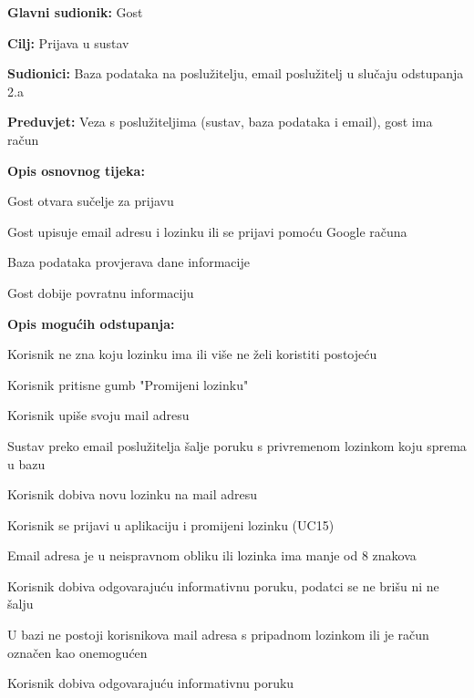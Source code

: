 				
				\noindent {}
				\begin{packed_item}
					\item \textbf{Glavni sudionik:} Gost
					\item  \textbf{Cilj:} Prijava u sustav
					\item  \textbf{Sudionici:} Baza podataka na poslužitelju, email poslužitelj u slučaju odstupanja 2.a
					\item  \textbf{Preduvjet:} Veza s poslužiteljima (sustav, baza podataka i email), gost ima račun
					\item  \textbf{Opis osnovnog tijeka:}
					\item[] \begin{packed_enum}
						\item Gost otvara sučelje za prijavu
						\item Gost upisuje email adresu i lozinku ili se prijavi pomoću Google računa
						\item Baza podataka provjerava dane informacije
						\item Gost dobije povratnu informaciju
					\end{packed_enum}
					\item  \textbf{Opis mogućih odstupanja:}
					\item[] \begin{packed_item}
						\item[2.a] Korisnik ne zna koju lozinku ima ili više ne želi koristiti postojeću
						\item[] \begin{packed_enum}
							\item Korisnik pritisne gumb "Promijeni lozinku"
							\item Korisnik upiše svoju mail adresu
							\item Sustav preko email poslužitelja šalje poruku s privremenom lozinkom koju sprema u bazu
							\item Korisnik dobiva novu lozinku na mail adresu
							\item Korisnik se prijavi u aplikaciju i promijeni lozinku (UC15)
						\end{packed_enum}
					    \item[3.a] Email adresa je u neispravnom obliku ili lozinka ima manje od 8 znakova
						\item[] \begin{packed_enum}
							\item Korisnik dobiva odgovarajuću informativnu poruku, podatci se ne brišu ni ne šalju
						\end{packed_enum}
						\item[3.b] U bazi ne postoji korisnikova mail adresa s pripadnom lozinkom ili je račun označen kao onemogućen
						\item[] \begin{packed_enum}
							\item Korisnik dobiva odgovarajuću informativnu poruku
						\end{packed_enum}
					\end{packed_item}
				\end{packed_item}
			
